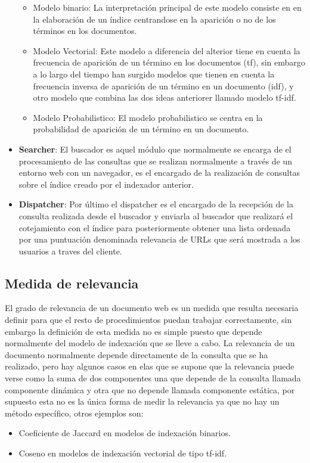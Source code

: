 \documentclass[a4paper, 11pt]{article} %
\begin{document}
\begin{itemize}
				\begin{itemize}
					\item Modelo binario: La interpretación principal de este modelo consiste en en la elaboración de un índice centrandose en la aparición o no de los términos en los documentos.
					\item Modelo Vectorial: Este modelo a diferencia del alterior tiene en cuenta la frecuencia de aparición de un término en los documentos (tf), sin embargo a lo largo del tiempo han surgido modelos que tienen en cuenta la frecuencia inversa de aparición de un término en un documento (idf), y otro modelo que combina las dos ideas anteriorer llamado modelo tf-idf.
					\item Modelo Probabilistico: El modelo probabilistico se centra en la probabilidad de aparición de un término en un documento.
				\end{itemize}
			\item \textbf{Searcher}: El buscador es aquel módulo que normalmente se encarga de el procesamiento de las consultas que se realizan normalmente a través de un entorno web con un navegador, es el encargado de la realización de consultas sobre el índice creado por el indexador anterior.
			\item \textbf{Dispatcher}: Por último el dispatcher es el encargado de la recepción de la consulta realizada desde el buscador y enviarla al buscador que realizará el cotejamiento con el índice para posteriormente obtener una lista ordenada por una puntuación denominada relevancia de URLs que será mostrada a los usuarios a traves del cliente.
		\end{itemize}

		\subsection{Medida de relevancia}
		El grado de relevancia de un documento web es un medida que resulta necesaria definir para que el resto de procedimientos puedan trabajar correctamente, sin embargo la definición de esta medida no es simple puesto que depende normalmente del modelo de indexación que se lleve a cabo. La relevancia de un documento normalmente depende directamente de la consulta que se ha realizado, pero hay algunos casos en elas que se supone que la relevancia puede verse como la suma de dos componentes una que depende de la consulta llamada componente dinámica y otra que no depende llamada componente estática, por supuesto esta no es la única forma de medir la relevancia ya que no hay un método específico, otros ejemplos son:
		\begin{itemize}
			\item Coeficiente de Jaccard en modelos de indexación binarios.
			\item Coseno en modelos de indexación vectorial de tipo tf-idf.
		\end{itemize}
\end{document}
